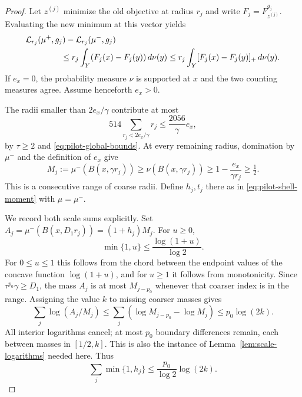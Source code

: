 \begin{proof}
Let $z^{(j)}$ minimize the old objective at radius $r_j$ and write
$F_j=F_{z^{(j)}}^{g_j}$.  Evaluating the new minimum at this vector yields
\begin{equation}
 \begin{split}
 &\mathcal L_{r_j}(\mu^+,g_j)-\mathcal L_{r_j}(\mu^-,g_j)\\
 &\hspace{15mm}\le r_j\int_Y(F_j(x)-F_j(y))\,d\nu(y)
 \le r_j\int_Y[F_j(x)-F_j(y)]_+\,d\nu(y).
 \end{split}
 \label{eq:pilot-candidate-drift}
\end{equation}
If $e_x=0$, the probability measure $\nu$ is supported at $x$ and the
two counting measures agree.  Assume henceforth $e_x>0$.

The radii smaller than $2e_x/\gamma$ contribute at most
\begin{equation}
 514\sum_{r_j<2e_x/\gamma}r_j
 \le\frac{2056}{\gamma}e_x,
 \label{eq:pilot-small-scales}
\end{equation}
by $\tau\ge2$ and \eqref{eq:pilot-global-bounds}.
At every remaining radius, domination by $\mu^-$ and the definition of
$e_x$ give
\begin{equation}
 M_j:=\mu^-(B(x,\gamma r_j))
 \ge\nu(B(x,\gamma r_j))
 \ge1-\frac{e_x}{\gamma r_j}\ge\tfrac12.
 \label{eq:pilot-inner-mass}
\end{equation}
This is a consecutive range of coarse radii.  Define $h_j,t_j$ there
as in \eqref{eq:pilot-shell-moment} with $\mu=\mu^-$.

We record both scale sums explicitly.  Set
$A_j=\mu^-(B(x,D_1r_j))=(1+h_j)M_j$.  For $u\ge0$,
\begin{equation}
 \min\{1,u\}\le\frac{\log(1+u)}{\log2}.
 \label{eq:pilot-capped-log}
\end{equation}
For $0\le u\le1$ this follows from the chord between the endpoint
values of the concave function $\log(1+u)$, and for $u\ge1$ it follows
from monotonicity.  Since $\tau^{p_0}\gamma\ge D_1$, the mass
$A_j$ is at most $M_{j-p_0}$ whenever that coarser index is in the range.
Assigning the value $k$ to missing coarser masses gives
\[
 \sum_j\log(A_j/M_j)
 \le\sum_j(\log M_{j-p_0}-\log M_j)
 \le p_0\log(2k).
\]
All interior logarithms cancel; at most $p_0$ boundary differences
remain, each between masses in $[1/2,k]$.  This is also the instance of
Lemma~\ref{lem:scale-logarithms} needed here.  Thus
\begin{equation}
 \sum_j\min\{1,h_j\}\le\frac{p_0}{\log2}\log(2k).
 \label{eq:pilot-shell-sum}
\end{equation}


\end{proof}
